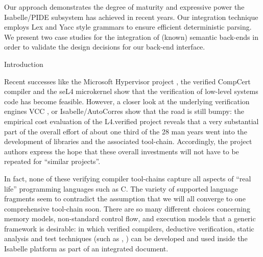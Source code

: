 \begin{isabellebody}
\begin{isamarkuptext*}
  Our approach demonstrates the degree of maturity and expressive power the Isabelle/PIDE subsystem
  has achieved in recent years. Our integration technique employs Lex and Yacc style grammars to 
  ensure efficient deterministic parsing. We present two case studies for the integration of 
  (known) semantic back-ends in order to validate the design decisions for our
  back-end interface.%
\end{isamarkuptext*}\isamarkuptrue%
%
\begin{isamarkupsection*}%
[label = {intro},type = {scholarly_paper.introduction}, args={label = {intro},type = {scholarly_paper.introduction}, Isa_COL.text_element.level = {}, Isa_COL.text_element.referentiable = {False}, Isa_COL.text_element.variants = {{STR ''outline'', STR ''document''}}, scholarly_paper.text_section.main_author = {}, scholarly_paper.text_section.fixme_list = {}, Isa_COL.text_element.level = {}}]Introduction%
\end{isamarkupsection*}\isamarkuptrue%
%
\begin{isamarkuptext*}%
[label = {introtext},type = {scholarly_paper.introduction}, args={label = {introtext},type = {scholarly_paper.introduction}, Isa_COL.text_element.level = {}, Isa_COL.text_element.referentiable = {False}, Isa_COL.text_element.variants = {{STR ''outline'', STR ''document''}}, scholarly_paper.text_section.main_author = {}, scholarly_paper.text_section.fixme_list = {}, Isa_COL.text_element.level = {}}]\noindent{}Recent successes like the Microsoft Hypervisor project \cite{DBLP:conf/fm/LeinenbachS09},
the verified CompCert compiler \cite{DBLP:journals/cacm/Leroy09}
and the seL4 microkernel \cite{DBLP:conf/sosp/KleinEHACDEEKNSTW09,DBLP:journals/tocs/KleinAEMSKH14} 
show that the verification of low-level systems code has become feasible.
However, a closer look at the underlying verification engines  
VCC \cite{DBLP:conf/tphol/CohenDHLMSST09}, 
or Isabelle/AutoCorres \cite{DBLP:conf/pldi/GreenawayLAK14}
show that the road is still bumpy: the  empirical cost evaluation  of the L4.verified project 
\cite{DBLP:journals/tocs/KleinAEMSKH14} reveals that a very substantial part  of the overall 
effort of about one third of the 28 man years went into the development of libraries and the 
associated tool-chain. Accordingly, the project authors \cite{DBLP:journals/tocs/KleinAEMSKH14} 
express the hope that these overall investments will not have to be repeated for 
``similar projects''.

In fact, none of these verifying compiler tool-chains capture all aspects of ``real life'' 
programming languages such as C. The variety of supported language fragments seem to contradict 
the assumption that we will all converge to one comprehensive tool-chain soon. There are so many 
different choices concerning memory models, non-standard control flow, and execution models 
that a generic framework is desirable: in which verified compilers, deductive verification, 
static analysis and test techniques (such as \cite{DBLP:conf/tap/Keller18}, 
\cite{DBLP:conf/itp/AissatVW16}) can be developed and used inside the Isabelle platform
as part of an integrated document.


\end{isamarkuptext*}
\end{isabellebody}
